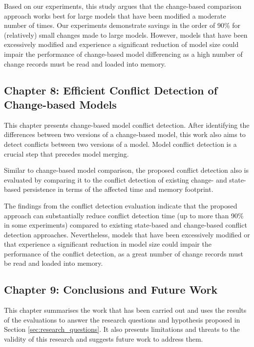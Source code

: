 Based on our experiments, this study argues that the change-based comparison approach works best for large models that have been modified a moderate number of times. Our experiments demonstrate savings in the order of 90\% for (relatively) small changes made to large models. However, models that have been excessively modified and experience a significant reduction of model size could impair the performance of change-based model differencing as a high number of change records must be read and loaded into memory.

\subsection{Chapter 8: Efficient Conflict Detection of Change-based Models}
\label{sec:chapter_7_conflict_detection}
This chapter presents change-based model conflict detection. After identifying the differences between two versions of a change-based model, this work also aims to detect conflicts between two versions of a model. Model conflict detection is a crucial step that precedes model merging.

Similar to change-based model comparison, the proposed conflict detection also is evaluated by comparing it to the conflict detection of existing change- and state-based persistence in terms of the affected time and memory footprint.

The findings from the conflict detection evaluation indicate that the proposed approach can substantially reduce conflict detection time (up to more than 90\% in some experiments) compared to existing state-based and change-based conflict detection approaches. Nevertheless, models that have been excessively modified or that experience a significant reduction in model size could impair the performance of the conflict detection, as a great number of change records must be read and loaded into memory.

\subsection{Chapter 9: Conclusions and Future Work}
\label{sec:chapter_8_conclusions_and_future_work}
This chapter summarises the work that has been carried out and uses the results of the evaluations to answer the research questions and hypothesis proposed in Section \ref{sec:research_questions}. It also presents limitations and threats to the validity of this research and suggests future work to address them.

